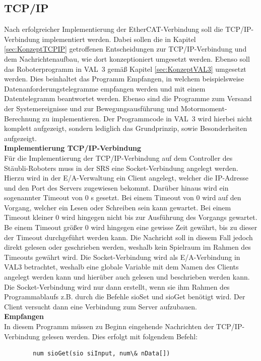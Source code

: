 \documentclass[ a4paper,
                oneside,
                toc=bibliography,
                toc=listof
                ]{scrbook}
\begin{document}
	\subsection{TCP/IP}
	Nach erfolgreicher Implementierung der EtherCAT-Verbindung soll die TCP/IP-Verbindung implementiert werden. Dabei sollen die in Kapitel \ref{sec:KonzeptTCPIP} getroffenen Entscheidungen zur TCP/IP-Verbindung  und dem Nachrichtenaufbau, wie dort konzeptioniert umgesetzt werden. Ebenso soll das Roboterprogramm in VAL~3 gemäß Kapitel \ref{sec:KonzeptVAL3} umgesetzt werden. Dies beinhaltet das Programm Empfangen, in welchem beispielsweise Datenanforderungstelegramme empfangen werden und mit einem Datentelegramm beantwortet werden. Ebenso sind die Programme zum Versand der Systemereignisse und zur Bewegungsausführung und Motormoment-Berechnung zu implementieren. Der Programmcode in VAL~3 wird hierbei nicht komplett aufgezeigt, sondern lediglich das Grundprinzip, sowie Besonderheiten aufgezeigt.\\
	\textbf{Implementierung TCP/IP-Verbindung}\\
	Für die Implementierung der TCP/IP-Verbindung auf dem Controller des Stäubli-Roboters muss in der SRS eine Socket-Verbindung angelegt werden. Hierzu wird in der E/A-Verwaltung ein Client angelegt, welcher die IP-Adresse und den Port des Servers zugewiesen bekommt. Darüber hinaus wird ein sogenannter Timeout von 0 s gesetzt. Bei einem Timeout von 0 wird auf den Vorgang, welcher ein Lesen oder Schreiben sein kann gewartet. Bei einem Timeout kleiner 0 wird hingegen nicht bis zur Ausführung des Vorgangs gewartet. Be einem Timeout größer 0 wird hingegen eine gewisse Zeit gewährt, bis zu dieser der Timeout durchgeführt werden kann. Die Nachricht soll in diesem Fall jedoch direkt gelesen oder geschrieben werden, weshalb kein Spielraum im Rahmen des Timeouts gewährt wird. \cite{VAL3} Die Socket-Verbindung wird als E/A-Verbindung in VAL3 betrachtet, weshalb eine globale Variable mit dem Namen des Clients angelegt werden kann und hierüber auch gelesen und beschrieben werden kann. Die Socket-Verbindung wird nur dann erstellt, wenn sie ihm Rahmen des Programmablaufs z.B. durch die Befehle sioSet und sioGet benötigt wird. Der Client versucht dann eine Verbindung zum Server aufzubauen. \cite{VAL3} \cite{CS9_TCP}\\
	\textbf{Empfangen}\\
	In diesem Programm müssen zu Beginn eingehende Nachrichten der TCP/IP-Verbindung gelesen werden. Dies erfolgt mit folgendem Befehl:
	\begin{lstlisting}
		num sioGet(sio siInput, num\& nData[])
	\end{lstlisting}
\end{document}
